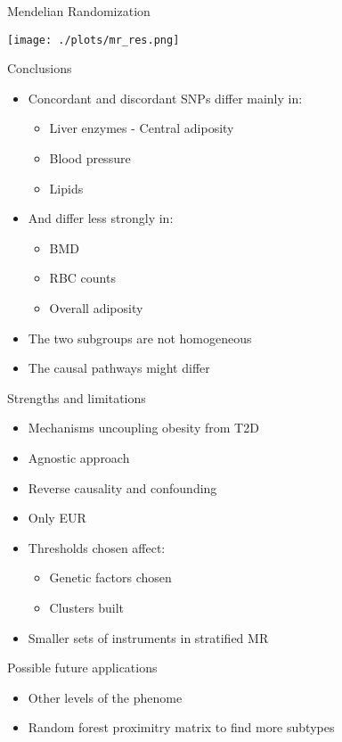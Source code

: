 \documentclass[presentation]{beamer}
\begin{document}
\begin{frame}[label={sec:orge8918cb}]{Mendelian Randomization}
\begin{center}
\texttt{[image: ./plots/mr\_res.png]}
\end{center}
\end{frame}
\begin{frame}[label={sec:orgf63432e}]{Conclusions}
\begin{itemize}
\item Concordant and discordant SNPs differ mainly in:
\begin{itemize}
\item Liver enzymes - Central adiposity
\item Blood pressure
\item Lipids
\end{itemize}
\item And differ less strongly in:
\begin{itemize}
\item BMD
\item RBC counts
\item Overall adiposity
\end{itemize}
\item The two subgroups are not homogeneous
\item The causal pathways might differ
\end{itemize}
\end{frame}
\begin{frame}[label={sec:org1bac6d4}]{Strengths and limitations}
\begin{itemize}
\item Mechanisms uncoupling obesity from T2D
\item Agnostic approach
\item Reverse causality and confounding
\item Only EUR
\item Thresholds chosen affect:
\begin{itemize}
\item Genetic factors chosen
\item Clusters built
\end{itemize}
\item Smaller sets of instruments in stratified MR
\end{itemize}
\end{frame}
\begin{frame}[label={sec:org9876618}]{Possible future applications}
\begin{itemize}
\item Other levels of the phenome
\item Random forest proximitry matrix to find more subtypes
\end{itemize}
\end{frame}
\end{document}
